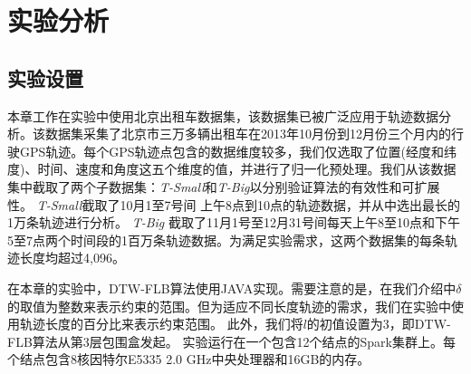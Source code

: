  
 
  \section{实验分析}\label{sec-c5-Exp}
  \subsection{实验设置}
  本章工作在实验中使用北京出租车数据集，该数据集已被广泛应用于轨迹数据分析。该数据集采集了北京市三万多辆出租车在2013年10月份到12月份三个月内的行驶GPS轨迹。每个GPS轨迹点包含的数据维度较多，我们仅选取了位置(经度和纬度)、时间、速度和角度这五个维度的值，并进行了归一化预处理。我们从该数据集中截取了两个子数据集：\emph{T-Small}和\emph{T-Big}以分别验证算法的有效性和可扩展性。
  \emph{T-Small}截取了10月1至7号间 上午8点到10点的轨迹数据，并从中选出最长的1万条轨迹进行分析。
  \emph{T-Big} 截取了11月1号至12月31号间每天上午8至10点和下午5至7点两个时间段的1百万条轨迹数据。为满足实验需求，这两个数据集的每条轨迹长度均超过4,096。
  
  在本章的实验中，DTW-FLB算法使用JAVA实现。需要注意的是，在我们介绍中$\delta$的取值为整数来表示约束的范围。但为适应不同长度轨迹的需求，我们在实验中使用轨迹长度的百分比来表示约束范围。
  此外，我们将$l$的初值设置为3，即DTW-FLB算法从第$3$层包围盒发起。
  实验运行在一个包含12个结点的Spark集群上。每个结点包含8核因特尔E5335 2.0 GHz中央处理器和16GB的内存。
  
